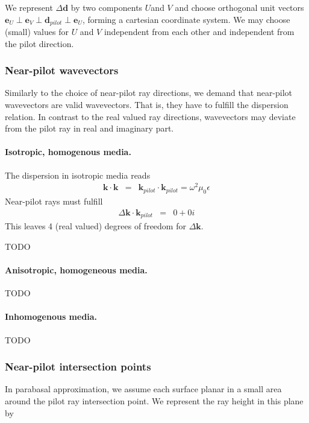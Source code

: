 \documentclass[12pt,a4paper,twoside,openright,BCOR10mm,headsepline,titlepage,abstracton,chapterprefix,final]{scrreprt}
\newcommand\Vector[1]{{\mathbf{#1}}}
\newcommand\vacuum{0}
\newcommand\wavenumber{k}
\newcommand\Wavevector{\Vector{\wavenumber}}
\newcommand\vacuumpermeability{\mu_{\vacuum}}
\newcommand\scalarpermittivity{\epsilon}
\begin{document}
We represent $\Delta\Vector{d}$ by two components $U$and $V$ 
and choose orthogonal unit vectors $\Vector{e}_{U} \perp \Vector{e}_{V} \perp \Vector{d}_{pilot} \perp \Vector{e}_{U}$,
forming a cartesian coordinate system.
We may choose (small) values for $U$ and $V$ independent from each other and independent from the pilot direction. 

\subsubsection{Near-pilot wavevectors}
Similarly to the choice of near-pilot ray directions, we demand that near-pilot wavevectors are valid wavevectors.
That is, they have to fulfill the dispersion relation. 
In contrast to the real valued ray directions, wavevectors may deviate from the pilot ray in real and imaginary part.

\paragraph{Isotropic, homogenous media.}

The dispersion in isotropic media reads
\begin{eqnarray}
 \Wavevector \cdot \Wavevector &=& \Wavevector_{pilot} \cdot \Wavevector_{pilot} = \omega^2 \vacuumpermeability \scalarpermittivity
\end{eqnarray}
Near-pilot rays must fulfill
\begin{eqnarray}
 \Delta \Wavevector \cdot \Wavevector_{pilot} &=& 0 + 0i
\end{eqnarray}
This leaves 4 (real valued) degrees of freedom for $\Delta \Wavevector$.

TODO

\paragraph{Anisotropic, homogeneous media.}
TODO

\paragraph{Inhomogenous media.}
TODO

\subsubsection{Near-pilot intersection points}

In parabasal approximation, we assume each surface planar in a small area around the pilot ray intersection point. 
We represent the ray height in this plane by
\end{document}
